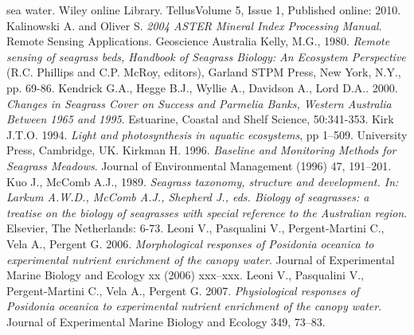 \documentclass[11pt]{article}
\begin{document}
\begin{thebibliography}{999}
{sea water}. Wiley online Library. TellusVolume 5, Issue 1, Published online: 2010. \pageref{Jerlov52}
Kalinowski A. and Oliver S. \emph{2004 ASTER Mineral Index Processing Manual}. Remote
Sensing Applications. Geoscience Australia \pageref{Kalinowski04}
Kelly, M.G., 1980. \emph{Remote sensing of seagrass beds, Handbook of Seagrass Biology: An
Ecosystem Perspective} (R.C. Phillips and C.P. McRoy, editors), Garland STPM Press, New
York, N.Y., pp. 69-86. \pageref{Kelly80}
Kendrick G.A., Hegge B.J., Wyllie A., Davidson A., Lord D.A.. 2000. \emph{Changes in Seagrass Cover on Success and Parmelia Banks, Western Australia Between 1965 and 1995}. Estuarine, Coastal and Shelf Science, 50:341-353. \pageref{Kendrick00}
Kirk J.T.O. 1994. \emph{Light and photosynthesis in aquatic ecosystems}, pp 1–509. University
Press, Cambridge, UK. \pageref{Kirk94}
Kirkman H. 1996. \emph{Baseline and Monitoring Methods for Seagrass Meadows}. Journal of
Environmental Management (1996) 47, 191–201. \pageref{Kirkman96}
Kuo J., McComb A.J., 1989. \emph{Seagrass taxonomy, structure and development. In: Larkum
A.W.D., McComb A.J., Shepherd J., eds. Biology of seagrasses: a treatise on the biology of seagrasses with special reference to the Australian region}. Elsevier, The Netherlands: 6-73. \pageref{Kuo89}
Leoni V., Pasqualini V., Pergent-Martini C., Vela A., Pergent G. 2006. \emph{Morphological responses of \textit{Posidonia oceanica} to experimental nutrient enrichment of the canopy water}. Journal of Experimental Marine Biology and Ecology xx (2006) xxx–xxx. \pageref{Leoni06}
Leoni V., Pasqualini V., Pergent-Martini C., Vela A., Pergent G. 2007. \emph{Physiological responses of \textit{{Posidonia oceanica}} to experimental nutrient enrichment of the canopy water}. Journal of Experimental Marine Biology and Ecology 349, 73–83. \pageref{Leoni07}

\end{thebibliography}
\end{document}
